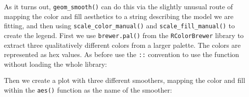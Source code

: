 \documentclass[]{book}
\newenvironment{Shaded}{\begin{snugshade}}{\end{snugshade}}
\newcommand{\CommentTok}[1]{\textcolor[rgb]{0.56,0.35,0.01}{\textit{#1}}}
\newcommand{\DecValTok}[1]{\textcolor[rgb]{0.00,0.00,0.81}{#1}}
\newcommand{\KeywordTok}[1]{\textcolor[rgb]{0.13,0.29,0.53}{\textbf{#1}}}
\newcommand{\NormalTok}[1]{#1}
\newcommand{\OperatorTok}[1]{\textcolor[rgb]{0.81,0.36,0.00}{\textbf{#1}}}
\newcommand{\StringTok}[1]{\textcolor[rgb]{0.31,0.60,0.02}{#1}}
\begin{document}
As it turns out, \texttt{geom\_smooth()} can do this via the slightly unusual route of mapping the color and fill aesthetics to a string describing the model we are fitting, and then using \texttt{scale\_color\_manual()} and \texttt{scale\_fill\_manual()} to create the legend. First we use \texttt{brewer.pal()} from the \texttt{RColorBrewer} library to extract three qualitatively different colors from a larger palette. The colors are represented as hex values. As before use the \texttt{::} convention to use the function without loading the whole library:\\

\begin{Shaded}
\end{Shaded}

Then we create a plot with three different smoothers, mapping the color and fill within the \texttt{aes()} function as the name of the smoother:\\
\end{document}
